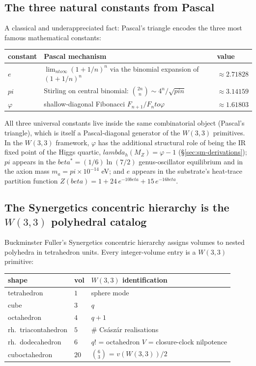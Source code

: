 \documentclass[11pt]{article}
\def\textbf#1{#1}%
\def\beta{beta}%
\def\lambda{lambda}%
\def\pi{pi}%
\def\to{ to }%
\begin{document}
\subsection*{The three natural constants from Pascal}

A classical and underappreciated fact: Pascal's triangle encodes the three most famous mathematical constants:

\begin{center}
\renewcommand{\arraystretch}{1.2}
\begin{tabular}{l l l}
\toprule
constant & Pascal mechanism & value \\
\midrule
$e$ & $\lim_{n\to\infty}(1+1/n)^n$ via the binomial expansion of $(1+1/n)^n$ & $\approx 2.71828$ \\
$\pi$ & Stirling on central binomial: $\binom{2n}{n} \sim 4^n/\sqrt{\pi n}$ & $\approx 3.14159$ \\
$\varphi$ & shallow-diagonal Fibonacci $F_{n+1}/F_n \to \varphi$ & $\approx 1.61803$ \\
\bottomrule
\end{tabular}
\end{center}

\textbf{All three universal constants live inside the same combinatorial object} (Pascal's triangle), which is itself a Pascal-diagonal generator of the $W(3,3)$ primitives. In the $W(3,3)$ framework, $\varphi$ has the additional structural role of being the IR fixed point of the Higgs quartic, $\lambda_h(M_Z) = \varphi - 1$ (\S\ref{sec:sm-derivations}); $\pi$ appears in the $\beta^* = (1/6)\ln(7/2)$ genus-oscillator equilibrium and in the axion mass $m_a = \pi\times 10^{-14}$ eV; and $e$ appears in the substrate's heat-trace partition function $Z(\beta) = 1 + 24\,e^{-10\beta} + 15\,e^{-16\beta}$.

\subsection*{The Synergetics concentric hierarchy is the $W(3,3)$ polyhedral catalog}

Buckminster Fuller's Synergetics concentric hierarchy assigns volumes to nested polyhedra in tetrahedron units. Every integer-volume entry is a $W(3,3)$ primitive:

\begin{center}
\renewcommand{\arraystretch}{1.2}
\begin{tabular}{l l l}
\toprule
shape & vol & $W(3,3)$ identification \\
\midrule
tetrahedron & $1$ & sphere mode \\
cube & $3$ & $q$ \\
octahedron & $4$ & $q+1$ \\
rh.\ triacontahedron & $5$ & \# Császár realisations \\
rh.\ dodecahedron & $6$ & $q!$ = octahedron $V$ = closure-clock nilpotence \\
cuboctahedron & $20$ & $\binom{6}{3}$ = $v(W(3,3))/2$ \\
\bottomrule
\end{tabular}
\end{center}
\end{document}
